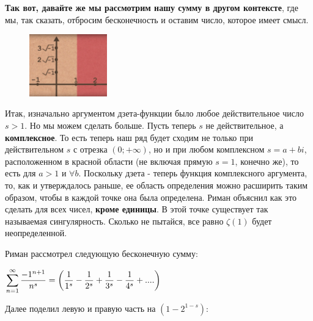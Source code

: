 \hspace{20}\textbf{Так вот, давайте же мы рассмотрим нашу сумму в другом контексте}, где мы, так сказать, отбросим бесконечность и оставим число, которое имеет смысл. 

\newline \hspace{20}
\begin{figure}
 \vspace{-20pt}
  \begin{center}
    \includegraphics[width=0.3\textwidth]{red.png}
  \end{center}
   \vspace{-20pt}
\end{figure}

\hspace{20}Итак, изначально аргументом дзета-функции было любое действительное число $s>1$. Но мы можем сделать больше. Пусть теперь $s$ не действительное, а \textbf{комплексное}. То есть теперь наш ряд будет сходим не только при действительном $s$ с отрезка $(0; +\infty)$, но и при любом комплексном $s = a+bi$, расположенном в красной области (не включая прямую $s=1$, конечно же), то есть для $a>1$ и $\forall b$.
Поскольку дзета - теперь функция комплексного аргумента, то, как и утверждалось раньше, ее область определения можно расширить таким образом, чтобы в каждой точке она была определена. Риман объяснил как это сделать для всех чисел, \textbf{кроме единицы}. В этой точке существует так называемая сингулярность. Сколько не пытайся, все равно $\zeta(1) $ будет неопределенной.


\hspace{20}Риман рассмотрел следующую бесконечную сумму:\\



\centerline{$\displaystyle\sum\limits_{n=1}^{\infty} \dfrac{-1^{n+1}}{n^s}= \left(\dfrac{1}{1^s}-\dfrac{1}{2^s}+\dfrac{1}{3^s}-\dfrac{1}{4^s}+....\right)$}


\hspace{20}Далее поделил левую и правую часть на $(1-2^{1-s})$:\\



